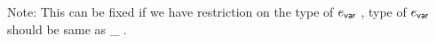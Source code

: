 \documentclass[11pt]{article}
\begin{document}
Note: This can be fixed if we have restriction on the type of $e_{\mathsf{var}}$ , type of $e_{\mathsf{var}}$ should be same as                                                                                                                                                                                                                                                                                                                                                                                                                                                                                                                                                                                                                                                                                                                                                                                                                                                                                                                                                     
\tau_ .
\end{document}
